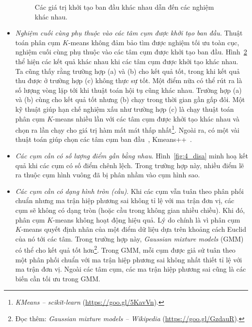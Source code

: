 \begin{itemize}
\begin{figure}[t]
\begin{subfigure}{0.325\textwidth}
\caption{}
\label{fig:4_dif_resc}
\end{subfigure}
\caption{
Các giá trị khởi tạo ban đầu khác nhau dẫn đến các nghiệm khác nhau.
}
\label{fig:4_dif_res}
\end{figure}
\item \textit{Nghiệm cuối cùng phụ thuộc vào các tâm cụm được khởi tạo ban
đầu.}
Thuật toán phân cụm $K$-means không đảm bảo tìm được nghiệm tối ưu toàn cục, nghiệm cuối cùng phụ thuộc vào các tâm cụm được khởi tạo ban đầu.
Hình~\ref{fig:4_dif_res} thể hiện các kết quả khác nhau khi các tâm cụm
được khởi tạo khác nhau. Ta cũng thấy rằng trường hợp (a) và (b) cho kết quả
tốt, trong khi kết quả thu được ở trường hợp (c) không thực sự tốt. Một điểm
nữa có thể rút ra là số lượng vòng lặp tới khi thuật toán hội tụ cũng khác
nhau. Trường hợp (a) và (b) cùng cho kết quả tốt nhưng (b) chạy trong thời
gian gần gấp đôi. Một kỹ thuật giúp hạn chế nghiệm xấu như trường hợp (c) là
chạy thuật toán phân cụm $K$-means nhiều lần với các tâm cụm được khởi tạo
khác nhau và chọn ra lần chạy cho giá trị hàm mất mát thấp nhất\footnote{\textit{KMeans -- scikit-learn} (\url{https://goo.gl/5KavVn}).}. Ngoài ra, có một vài thuật toán giúp chọn các tâm cụm ban đầu~\cite{khan2004cluster},
Kmeans++~\cite{arthur2007k,bahmani2012scalable}.

\item \textit{Các cụm cần có số lượng điểm gần bằng nhau}.
Hình~\ref{fig:4_disa} minh hoạ kết quả khi các cụm có số điểm
chênh lệch. Trong trường hợp này, nhiều điểm lẽ ra thuộc cụm hình vuông đã bị phân nhầm vào cụm hình sao.

\item \textit{Các cụm cần có dạng hình tròn (cầu)}.
Khi các cụm vẫn tuân theo phân phối chuẩn nhưng ma trận hiệp phương sai
không tỉ lệ với ma trận đơn vị, các cụm sẽ không có dạng tròn
(hoặc cầu trong không gian nhiều chiều). Khi đó, phân cụm $K$-means không hoạt động hiệu quả. Lý do chính là vì phân cụm $K$-means quyết định
nhãn của một điểm dữ liệu dựa trên khoảng cách Euclid của nó tới các
tâm. Trong trường hợp này, \textit{Gaussian mixture models} (GMM)~\cite{reynolds2015gaussian} có thể cho kết quả tốt hơn\footnote{Đọc thêm:
\textit{Gaussian mixture models -- Wikipedia} (\url{https://goo.gl/GzdauR}).}. Trong GMM, mỗi cụm được giả sử tuân theo một phân phối chuẩn với ma trận hiệp phương sai không nhất thiết tỉ lệ với ma trận đơn vị. Ngoài các tâm cụm, các ma trận hiệp phương sai cũng là các biến cần tối ưu trong GMM.



\end{itemize}
